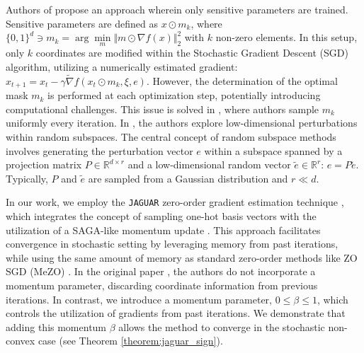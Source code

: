 \documentclass{article}
\theoremstyle{plain}
\theoremstyle{definition}
\theoremstyle{remark}
\begin{document}
Authors of \cite{extreme_sparsity} propose an approach wherein only sensitive parameters are trained. Sensitive parameters are defined as $x \odot m_k$, where $\{0,1\}^d \ni m_k = \operatorname{arg}\min\limits_m \Vert m \odot \nabla f(x) \Vert_2^2$ with $k$ non-zero elements. In this setup, only $k$ coordinates are modified within the Stochastic Gradient Descent (SGD) algorithm, utilizing a numerically estimated gradient: $x_{t+1} = x_{t} - \gamma \widetilde{\nabla} f(x_{t} \odot m_k, \xi, e)$. However, the determination of the optimal mask $m_k$ is performed at each optimization step, potentially introducing computational challenges.
This issue is solved in \cite{liu2024sparse, wang2024simultaneous}, where authors sample $m_k$ uniformly every iteration.
In \cite{roberts2023direct, nozawa2025zeroth}, the authors explore low-dimensional perturbations within random subspaces. The central concept of random subspace methods involves generating the perturbation vector $e$ within a subspace spanned by a projection matrix $P \in \mathbb{R}^{d \times r}$ and a low-dimensional random vector $\tilde{e} \in \mathbb{R}^r$: $e = P \tilde{e}$. Typically, $P$ and $\tilde{e}$ are sampled from a Gaussian distribution and $r \ll d$.

In our work, we employ the \texttt{JAGUAR} zero-order gradient estimation technique \cite{veprikov2024new}, which integrates the concept of sampling one-hot basis vectors with the utilization of a SAGA-like momentum update \cite{defazio2014saga}. This approach facilitates convergence in stochastic setting by leveraging memory from past iterations, while using the same amount of memory as standard zero-order methods like ZO SGD (MeZO) \cite{malladi2023fine}. In the original paper \cite{veprikov2024new}, the authors do not incorporate a momentum parameter, discarding coordinate information from previous iterations. In contrast, we introduce a momentum parameter, $0 \leq \beta \leq 1$, which controls the utilization of gradients from past iterations. We demonstrate that adding this momentum $\beta$ allows the method to converge in the stochastic non-convex case (see Theorem \ref{theorem:jaguar_sign}).
\end{document}
